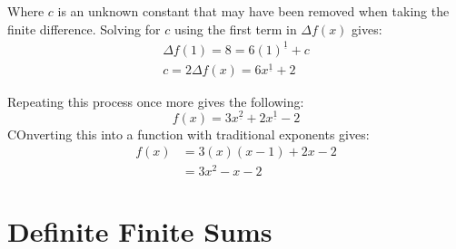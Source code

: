 Where \(c\) is an unknown constant that may have been removed when taking the finite difference. Solving for \(c\) using the first term in \(\Delta f(x)\) gives:
\begin{align*}
    \Delta f(1) = 8 = 6(1)^{\underline{1}} + c \\
    c = 2
    \Delta f(x) = 6x^{\underline{1}} + 2
\end{align*}

Repeating this process once more gives the following: \[f(x) = 3x^{\underline{2}} + 2x^{\underline{1}} - 2\]
COnverting this into a function with traditional exponents gives: 
\begin{align*}
    f(x) & = 3(x)(x-1) + 2x - 2 \\
    & = 3x^2 - x - 2
\end{align*}

\section{Definite Finite Sums}
